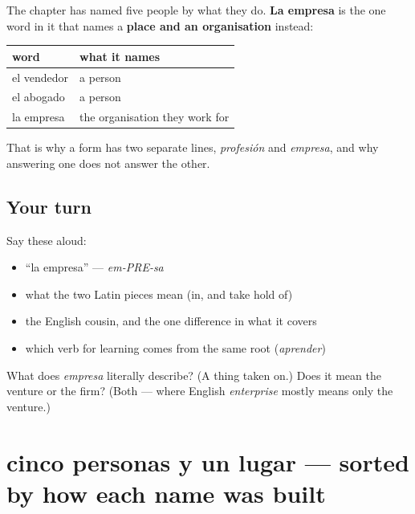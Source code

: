 \begin{grammarlens}[title={Grammar Lens: a workplace rather than a worker}]
The chapter has named five people by what they do. \textbf{La empresa} is the one word in it that names a \textbf{place and an organisation} instead:

\noindent
\begin{tabularx}{\linewidth}{@{}>{\raggedright\arraybackslash}X>{\raggedright\arraybackslash}X@{}}
\toprule
\textbf{word} & \textbf{what it names} \\
\midrule
el vendedor & a person \\
el abogado & a person \\
la empresa & the organisation they work for \\
\bottomrule
\end{tabularx}

That is why a form has two separate lines, \emph{profesión} and \emph{empresa}, and why answering one does not answer the other.
\end{grammarlens}

\subsection*{Your turn}
Say these aloud:

\begin{itemize}
\raggedright
  \item \textquotedblleft{}la empresa\textquotedblright{} — \emph{em-PRE-sa}
  \item what the two Latin pieces mean (in, and take hold of)
  \item the English cousin, and the one difference in what it covers
  \item which verb for learning comes from the same root (\emph{aprender})
\end{itemize}

\begin{tcolorbox}[breakable,colback=teal!4,colframe=teal!35!black,title={Before you move on}]
What does \emph{empresa} literally describe? (A thing taken on.) Does it mean the venture or the firm? (Both — where English \emph{enterprise} mostly means only the venture.)
\end{tcolorbox}
\section[cinco personas y un lugar]{cinco personas y un lugar — sorted by how each name was built}


